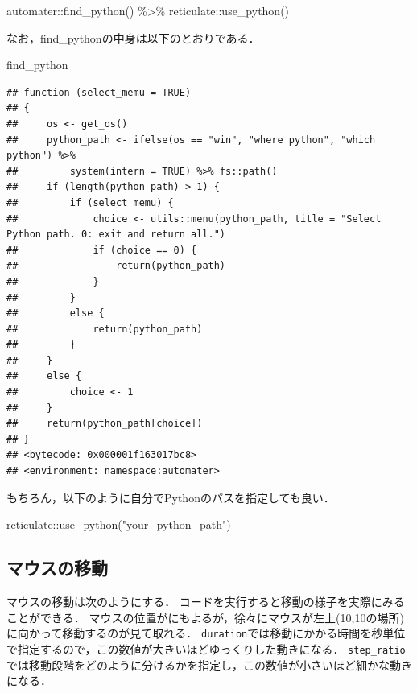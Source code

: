 \documentclass[
]{article}
\newenvironment{Shaded}{\begin{snugshade}}{\end{snugshade}}
\newcommand{\FunctionTok}[1]{\textcolor[rgb]{0.00,0.00,0.00}{#1}}
\newcommand{\NormalTok}[1]{#1}
\newcommand{\SpecialCharTok}[1]{\textcolor[rgb]{0.00,0.00,0.00}{#1}}
\newcommand{\StringTok}[1]{\textcolor[rgb]{0.31,0.60,0.02}{#1}}
\begin{document}
\begin{Shaded}
\begin{Highlighting}[]
\NormalTok{automater}\SpecialCharTok{::}\FunctionTok{find\_python}\NormalTok{() }\SpecialCharTok{\%\textgreater{}\%}
\NormalTok{  reticulate}\SpecialCharTok{::}\FunctionTok{use\_python}\NormalTok{()}
\end{Highlighting}
\end{Shaded}

なお，find\_pythonの中身は以下のとおりである．

\begin{Shaded}
\begin{Highlighting}[]
\NormalTok{find\_python}
\end{Highlighting}
\end{Shaded}

\begin{verbatim}
## function (select_memu = TRUE) 
## {
##     os <- get_os()
##     python_path <- ifelse(os == "win", "where python", "which python") %>% 
##         system(intern = TRUE) %>% fs::path()
##     if (length(python_path) > 1) {
##         if (select_memu) {
##             choice <- utils::menu(python_path, title = "Select Python path. 0: exit and return all.")
##             if (choice == 0) {
##                 return(python_path)
##             }
##         }
##         else {
##             return(python_path)
##         }
##     }
##     else {
##         choice <- 1
##     }
##     return(python_path[choice])
## }
## <bytecode: 0x000001f163017bc8>
## <environment: namespace:automater>
\end{verbatim}

もちろん，以下のように自分でPythonのパスを指定しても良い．

\begin{Shaded}
\begin{Highlighting}[]
\NormalTok{reticulate}\SpecialCharTok{::}\FunctionTok{use\_python}\NormalTok{(}\StringTok{"your\_python\_path"}\NormalTok{)}
\end{Highlighting}
\end{Shaded}

\hypertarget{ux30deux30a6ux30b9ux306eux79fbux52d5}{%
\subsection{マウスの移動}\label{ux30deux30a6ux30b9ux306eux79fbux52d5}}

マウスの移動は次のようにする．
コードを実行すると移動の様子を実際にみることができる．
マウスの位置がにもよるが，徐々にマウスが左上(10,10の場所)に向かって移動するのが見て取れる．
\texttt{duration}では移動にかかる時間を秒単位で指定するので，この数値が大きいほどゆっくりした動きになる．
\texttt{step\_ratio}では移動段階をどのように分けるかを指定し，この数値が小さいほど細かな動きになる．
\end{document}
